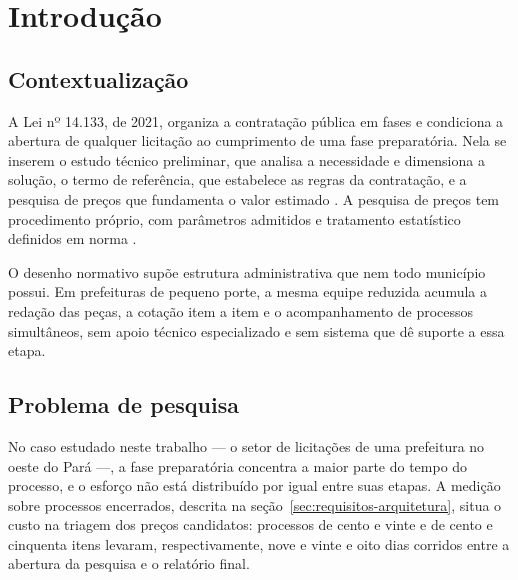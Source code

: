 \section{Introdução}

\subsection{Contextualização}

A Lei nº 14.133, de 2021, organiza a contratação pública em fases e condiciona a
abertura de qualquer licitação ao cumprimento de uma fase preparatória. Nela se
inserem o estudo técnico preliminar, que analisa a necessidade e dimensiona a
solução, o termo de referência, que estabelece as regras da contratação, e a
pesquisa de preços que fundamenta o valor estimado \cite{brasil2021lei14133}. A
pesquisa de preços tem procedimento próprio, com parâmetros admitidos e
tratamento estatístico definidos em norma \cite{brasil2021in65}.

O desenho normativo supõe estrutura administrativa que nem todo município
possui. Em prefeituras de pequeno porte, a mesma equipe reduzida acumula a
redação das peças, a cotação item a item e o acompanhamento de processos
simultâneos, sem apoio técnico especializado e sem sistema que dê suporte a essa
etapa.


\subsection{Problema de pesquisa}

No caso estudado neste trabalho --- o setor de licitações de uma prefeitura no
oeste do Pará ---, a fase preparatória concentra a maior parte do tempo do
processo, e o esforço não está distribuído por igual entre suas etapas. A
medição sobre processos encerrados, descrita na
seção~\ref{sec:requisitos-arquitetura}, situa o custo na triagem dos preços
candidatos: processos de cento e vinte e de cento e cinquenta itens levaram,
respectivamente, nove e vinte e oito dias corridos entre a abertura da pesquisa e
o relatório final.

